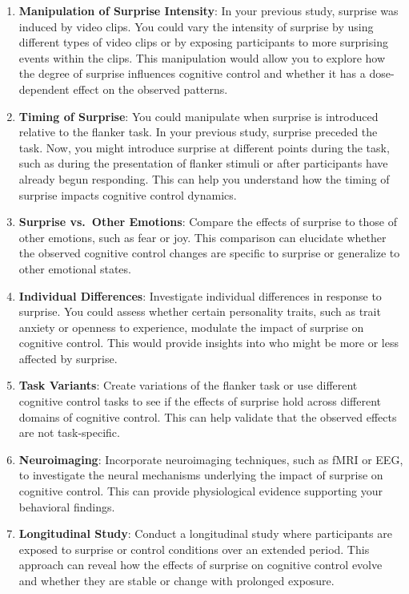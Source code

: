 \documentclass[
  man]{apa7}
\begin{document}
\begin{enumerate}
\def\labelenumi{\arabic{enumi}.}
\item
  \textbf{Manipulation of Surprise Intensity}: In your previous study, surprise was induced by video clips. You could vary the intensity of surprise by using different types of video clips or by exposing participants to more surprising events within the clips. This manipulation would allow you to explore how the degree of surprise influences cognitive control and whether it has a dose-dependent effect on the observed patterns.
\item
  \textbf{Timing of Surprise}: You could manipulate when surprise is introduced relative to the flanker task. In your previous study, surprise preceded the task. Now, you might introduce surprise at different points during the task, such as during the presentation of flanker stimuli or after participants have already begun responding. This can help you understand how the timing of surprise impacts cognitive control dynamics.
\item
  \textbf{Surprise vs.~Other Emotions}: Compare the effects of surprise to those of other emotions, such as fear or joy. This comparison can elucidate whether the observed cognitive control changes are specific to surprise or generalize to other emotional states.
\item
  \textbf{Individual Differences}: Investigate individual differences in response to surprise. You could assess whether certain personality traits, such as trait anxiety or openness to experience, modulate the impact of surprise on cognitive control. This would provide insights into who might be more or less affected by surprise.
\item
  \textbf{Task Variants}: Create variations of the flanker task or use different cognitive control tasks to see if the effects of surprise hold across different domains of cognitive control. This can help validate that the observed effects are not task-specific.
\item
  \textbf{Neuroimaging}: Incorporate neuroimaging techniques, such as fMRI or EEG, to investigate the neural mechanisms underlying the impact of surprise on cognitive control. This can provide physiological evidence supporting your behavioral findings.
\item
  \textbf{Longitudinal Study}: Conduct a longitudinal study where participants are exposed to surprise or control conditions over an extended period. This approach can reveal how the effects of surprise on cognitive control evolve and whether they are stable or change with prolonged exposure.

\end{enumerate}
\end{document}
